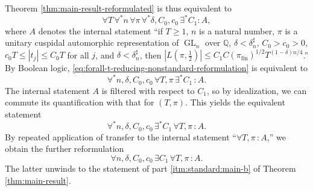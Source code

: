\documentclass[reqno]{amsart}
\DeclareMathOperator{\GL}{GL}
\DeclareMathOperator{\fin}{fin}
\theoremstyle{plain} \newtheorem{theorem} {Theorem}
\theoremstyle{definition} \newtheorem{definition} [theorem] {Definition}
\theoremstyle{itplain} %
\numberwithin{equation}{section}
\numberwithin{theorem}{section}
\renewcommand{\geq}{\geqslant}
\renewcommand{\leq}{\leqslant}
\begin{document}
Theorem \ref{thm:main-result-reformulated} is thus equivalent to
\begin{equation}\label{eq:forall-t-reducing-nonstandard-reformulation}
  \forall T \,
  \forall^* n \,
  \forall \pi \,
  \forall^* \delta , C_0, c_0 \,
  \exists^* C_1 : A,
\end{equation}
where $A$ denotes the internal statement ``if $T \geq 1$, $n$ is a natural number, $\pi$ is a unitary cuspidal automorphic representation of $\GL_n$ over $\mathbb{Q}$, $\delta < \delta_n ^\sharp$, $C_0 > c_0 > 0$, $c_0 T \leq |t_j|  \leq C_0 T$ for all $j$, and $\delta < \delta_n^\sharp$, then $|L(\pi,\tfrac{1}{2})| \leq C_1 C(\pi_{\fin})^{1/2} T^{(1-\delta) n/4}$.''  By Boolean logic, \eqref{eq:forall-t-reducing-nonstandard-reformulation} is equivalent to
\begin{equation*}
  \forall^* n, \delta , C_0, c_0  \,
  \forall T , \pi  \,
  \exists^* C_1 \, : A.
\end{equation*}
The internal statement $A$ is filtered with respect to $C_1$, so by idealization, we can commute its quantification with that for $(T,\pi)$.  This yields the equivalent statement
\begin{equation}\label{eq:forall-n-delta}
  \forall^* n, \delta , C_0, c_0  \,
  \exists^* C_1 \,
  \forall T , \pi  \,
  : A.
\end{equation}
By repeated application of transfer to the internal statement ``$\forall T, \pi \, : A$,'' we obtain the further reformulation
\begin{equation*}
  \forall n, \delta , C_0, c_0  \,
  \exists C_1 \,
  \forall T , \pi  \,
  : A.
\end{equation*}
The latter unwinds to the statement of part \eqref{itm:standard:main-b} of Theorem \ref{thm:main-result}.
\end{document}
